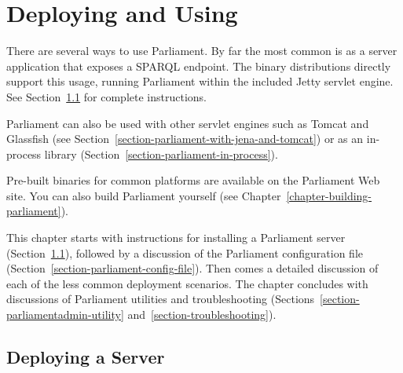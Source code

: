 
\chapter{Deploying and Using \protect\pmnt}
\label{chapter-deploying-and-using}

There are several ways to use Parliament.  By far the most common is as a server application that exposes a SPARQL endpoint.  The binary distributions directly support this usage, running Parliament within the included Jetty servlet engine.  See Section~\ref{section-std-server-deploy} for complete instructions.

Parliament can also be used with other servlet engines such as Tomcat and Glassfish (see Section~\ref{section-parliament-with-jena-and-tomcat}) or as an in-process library (Section~\ref{section-parliament-in-process}).

Pre-built binaries for common platforms are available on the Parliament Web site.  You can also build Parliament yourself (see Chapter~\ref{chapter-building-parliament}).

This chapter starts with instructions for installing a Parliament server (Section~\ref{section-std-server-deploy}), followed by a discussion of the Parliament configuration file (Section~\ref{section-parliament-config-file}).  Then comes a detailed discussion of each of the less common deployment scenarios.  The chapter concludes with discussions of Parliament utilities and troubleshooting (Sections~\ref{section-parliamentadmin-utility} and~\ref{section-troubleshooting}).

\section{Deploying a \protect\pmnt{} Server}
\label{section-std-server-deploy}

